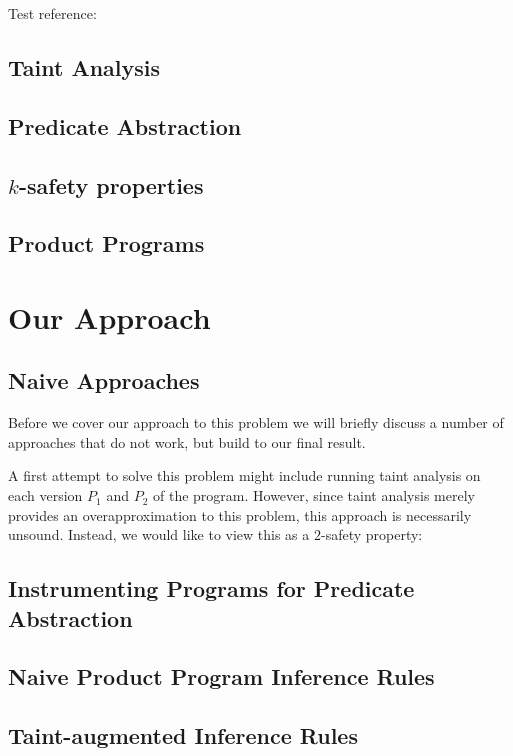 \documentclass[letterpaper,twocolumn,10pt]{article}
\begin{document}
Test reference: \cite{GKW18}

\subsection{Taint Analysis}

\subsection{Predicate Abstraction}

\subsection{$k$-safety properties}

\subsection{Product Programs}

\section{Our Approach}

\subsection{Naive Approaches}

Before we cover our approach to this problem we will briefly discuss a number of approaches that do not work, but build to our final result.

A first attempt to solve this problem might include running taint analysis on each version $P_1$ and $P_2$ of the program. However, since
taint analysis merely provides an overapproximation to this problem, this approach is necessarily unsound. Instead, we would like to view
this as a $2$-safety property: 

\subsection{Instrumenting Programs for Predicate Abstraction}

\subsection{Naive Product Program Inference Rules}

\subsection{Taint-augmented Inference Rules}
\end{document}
